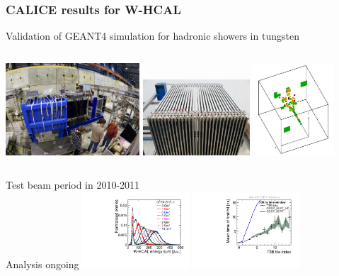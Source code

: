 \documentclass{beamer}
\begin{document}
\begin{frame}
\frametitle{CALICE results for W-HCAL}
\alert{Validation of GEANT4 simulation for hadronic showers in tungsten}\\
\begin{columns}[c]
\column{5cm}
\includegraphics[width=5cm]{whcal_model.png}
\column{4cm}
\includegraphics[width=4cm]{Fig820b.pdf}
\column{3cm}
\includegraphics[width=3cm]{Fig820c.pdf}
\end{columns}
\begin{columns}[c]
\column{5cm}
Test beam period in 2010-2011\\
Analysis ongoing
\column{4cm}
\includegraphics[width=4cm]{Fig821.pdf}
\column{4cm}
\includegraphics[width=4cm]{Fig824.pdf}
\end{columns}
\end{frame}
\end{document}
